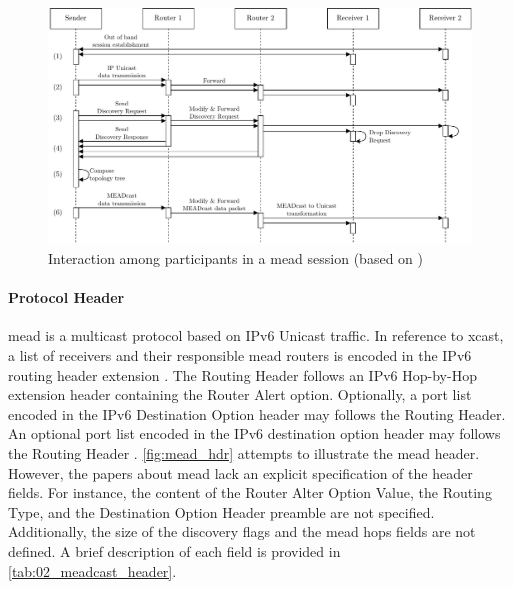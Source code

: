 \begin{figure}
    \centering
    \includegraphics[width=.95\textwidth]{Bilder/mead_seq_dia.pdf}
    \caption[Interaction among participants in a MEADcast session]{
        Interaction among participants in a \gls{mead} session (based on \cite{meadcast2})}
    \label{fig:mead_seq_dia}
\end{figure}

\paragraph{Protocol Header} %
\label{par:Protocol Header}
\gls{mead} is a multicast protocol based on IPv6 Unicast traffic.
In reference to \gls{xcast}, a list of receivers and their responsible
    \gls{mead} routers is encoded in the IPv6 routing header extension
    \cite{meadcast2}.
The Routing Header follows an IPv6 Hop-by-Hop extension header containing the
    Router Alert option\cite{meadcast2}.
Optionally, a port list encoded in the IPv6 Destination Option header may
    follows the Routing Header.
An optional port list encoded in the IPv6 destination option header may follows
    the Routing Header \cite{meadcast2}.
\autoref{fig:mead_hdr} attempts to illustrate the \gls{mead} header.
However, the papers about \gls{mead} \cite{meadcast1, meadcast2} lack an
    explicit specification of the header fields.
For instance, the content of the Router Alter Option Value, the Routing Type,
    and the Destination Option Header preamble are not specified.
Additionally, the size of the discovery flags and the \gls{mead} hops fields
    are not defined.
A brief description of each field is provided in
\autoref{tab:02_meadcast_header}.

